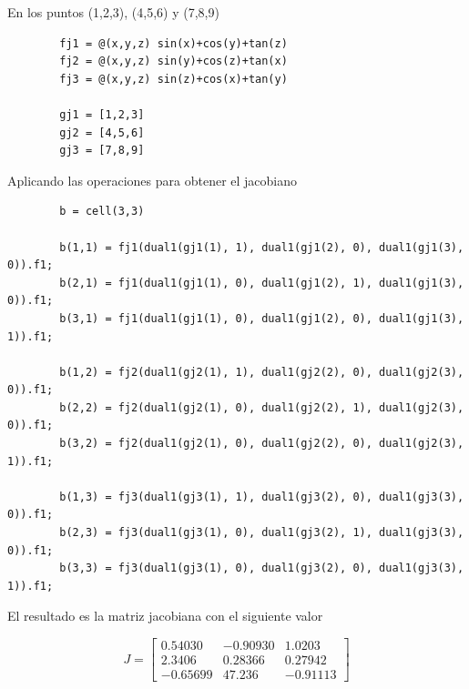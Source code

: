 \documentclass[a4paper, 12pt]{article}
\begin{document}
    En los puntos (1,2,3), (4,5,6) y (7,8,9)

    \begin{verbatim}
        fj1 = @(x,y,z) sin(x)+cos(y)+tan(z)
        fj2 = @(x,y,z) sin(y)+cos(z)+tan(x)
        fj3 = @(x,y,z) sin(z)+cos(x)+tan(y)

        gj1 = [1,2,3]
        gj2 = [4,5,6]
        gj3 = [7,8,9]
    \end{verbatim}

    Aplicando las operaciones para obtener el jacobiano

    \begin{verbatim}
        b = cell(3,3)

        b(1,1) = fj1(dual1(gj1(1), 1), dual1(gj1(2), 0), dual1(gj1(3), 0)).f1;
        b(2,1) = fj1(dual1(gj1(1), 0), dual1(gj1(2), 1), dual1(gj1(3), 0)).f1;
        b(3,1) = fj1(dual1(gj1(1), 0), dual1(gj1(2), 0), dual1(gj1(3), 1)).f1;

        b(1,2) = fj2(dual1(gj2(1), 1), dual1(gj2(2), 0), dual1(gj2(3), 0)).f1;
        b(2,2) = fj2(dual1(gj2(1), 0), dual1(gj2(2), 1), dual1(gj2(3), 0)).f1;
        b(3,2) = fj2(dual1(gj2(1), 0), dual1(gj2(2), 0), dual1(gj2(3), 1)).f1;

        b(1,3) = fj3(dual1(gj3(1), 1), dual1(gj3(2), 0), dual1(gj3(3), 0)).f1;
        b(2,3) = fj3(dual1(gj3(1), 0), dual1(gj3(2), 1), dual1(gj3(3), 0)).f1;
        b(3,3) = fj3(dual1(gj3(1), 0), dual1(gj3(2), 0), dual1(gj3(3), 1)).f1;
    \end{verbatim}

    El resultado es la matriz jacobiana con el siguiente valor

    \[
        J = \begin{bmatrix}
            0.54030 & -0.90930 & 1.0203 \\
            2.3406 & 0.28366 & 0.27942 \\
            -0.65699 & 47.236 & -0.91113
        \end{bmatrix}
    \]


    
\end{document}
